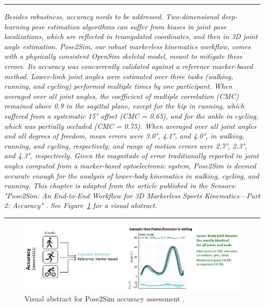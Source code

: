\begin{center}
\rule{0.7\linewidth}{.5pt}
\begin{minipage}{0.7\linewidth}
\smallskip

\textit{Besides robustness, accuracy needs to be addressed. Two-dimensional deep-learning pose estimation algorithms can suffer from biases in joint pose localizations, which are reflected in triangulated coordinates, and then in 3D joint angle estimation. Pose2Sim, our robust markerless kinematics workflow, comes with a physically consistent OpenSim skeletal model, meant to mitigate these errors. \newline\newline
Its accuracy was concurrently validated against a reference marker-based method. Lower-limb joint angles were estimated over three tasks (walking, running, and cycling) performed multiple times by one participant. When averaged over all joint angles, the coefficient of multiple correlation (CMC) remained above 0.9 in the sagittal plane, except for the hip in running, which suffered from a systematic 15° offset (CMC = 0.65), and for the ankle in cycling, which was partially occluded (CMC = 0.75). When averaged over all joint angles and all degrees of freedom, mean errors were 3.0°, 4.1°, and 4.0°, in walking, running, and cycling, respectively; and range of motion errors were 2.7°, 2.3°, and 4.3°, respectively. Given the magnitude of error traditionally reported in joint angles computed from a marker-based optoelectronic system, Pose2Sim is deemed accurate enough for the analysis of lower-body kinematics in walking, cycling, and running.\newline\newline
This chapter is adapted from the article published in the Sensors: "Pose2Sim: An End-to-End Workflow for 3D Markerless Sports Kinematics—Part 2: Accuracy" \cite{Pagnon2022a}. See Figure~\ref{fig_visabstract3} for a visual abstract.
}

\end{minipage}
\smallskip
\rule{0.7\linewidth}{.5pt}
\end{center}

\pagebreak
\minitoc

\vspace*{3cm}

\begin{figure}[hbtp]
	\centering
	\def\svgwidth{1\columnwidth}
	\fontsize{10pt}{10pt}\selectfont
	\includegraphics[width=\linewidth]{"../Intro/Figures/Fig_VisAbstract3.JPG"}
      \caption{Visual abstract for Pose2Sim accuracy assessment \cite{Pagnon2022a}.}
	\label{fig_visabstract3}
\end{figure}

